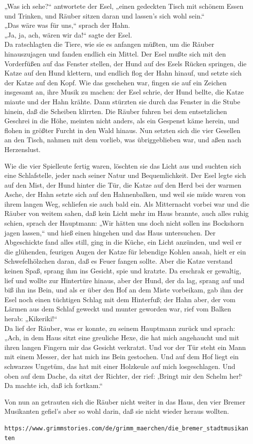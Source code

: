 \documentclass[12pt,a4paper]{article}
\begin{document}
„Was ich sehe?“ antwortete der Esel, „einen gedeckten Tisch mit schönem Essen und Trinken, und Räuber sitzen daran und lassen's sich wohl sein.“\\

„Das wäre was für uns,“ sprach der Hahn.\\

„Ja, ja, ach, wären wir da!“ sagte der Esel.\\

Da ratschlagten die Tiere, wie sie es anfangen müßten, um die Räuber hinauszujagen und fanden endlich ein Mittel. Der Esel mußte sich mit den Vorderfüßen auf das Fenster stellen, der Hund auf des Esels Rücken springen, die Katze auf den Hund klettern, und endlich flog der Hahn hinauf, und setzte sich der Katze auf den Kopf. Wie das geschehen war, fingen sie auf ein Zeichen insgesamt an, ihre Musik zu machen: der Esel schrie, der Hund bellte, die Katze miaute und der Hahn krähte. Dann stürzten sie durch das Fenster in die Stube hinein, daß die Scheiben klirrten. Die Räuber fuhren bei dem entsetzlichen Geschrei in die Höhe, meinten nicht anders, als ein Gespenst käme herein, und flohen in größter Furcht in den Wald hinaus. Nun setzten sich die vier Gesellen an den Tisch, nahmen mit dem vorlieb, was übriggeblieben war, und aßen nach Herzenslust.\par

Wie die vier Spielleute fertig waren, löschten sie das Licht aus und suchten sich eine Schlafstelle, jeder nach seiner Natur und Bequemlichkeit. Der Esel legte sich auf den Mist, der Hund hinter die Tür, die Katze auf den Herd bei der warmen Asche, der Hahn setzte sich auf den Hahnenbalken, und weil sie müde waren von ihrem langen Weg, schliefen sie auch bald ein. Als Mitternacht vorbei war und die Räuber von weitem sahen, daß kein Licht mehr im Haus brannte, auch alles ruhig schien, sprach der Hauptmann: „Wir hätten uns doch nicht sollen ins Bockshorn jagen lassen,“ und hieß einen hingehen und das Haus untersuchen. Der Abgeschickte fand alles still, ging in die Küche, ein Licht anzünden, und weil er die glühenden, feurigen Augen der Katze für lebendige Kohlen ansah, hielt er ein Schwefelhölzchen daran, daß es Feuer fangen sollte. Aber die Katze verstand keinen Spaß, sprang ihm ins Gesicht, spie und kratzte. Da erschrak er gewaltig, lief und wollte zur Hintertüre hinaus, aber der Hund, der da lag, sprang auf und biß ihn ins Bein, und als er über den Hof an dem Miste vorbeikam, gab ihm der Esel noch einen tüchtigen Schlag mit dem Hinterfuß; der Hahn aber, der vom Lärmen aus dem Schlaf geweckt und munter geworden war, rief vom Balken herab: „Kikeriki!“\\
Da lief der Räuber, was er konnte, zu seinem Hauptmann zurück und sprach: „Ach, in dem Haus sitzt eine greuliche Hexe, die hat mich angehaucht und mit ihren langen Fingern mir das Gesicht verkratzt. Und vor der Tür steht ein Mann mit einem Messer, der hat mich ins Bein gestochen. Und auf dem Hof liegt ein schwarzes Ungetüm, das hat mit einer Holzkeule auf mich losgeschlagen. Und oben auf dem Dache, da sitzt der Richter, der rief: ‚Bringt mir den Schelm her!‘ Da machte ich, daß ich fortkam.“\par

Von nun an getrauten sich die Räuber nicht weiter in das Haus, den vier Bremer Musikanten gefiel's aber so wohl darin, daß sie nicht wieder heraus wollten.

\vspace{2em}

\texttt{https://www.grimmstories.com/de/grimm\_maerchen/die\_bremer\_stadtmusikanten}
\end{document}
